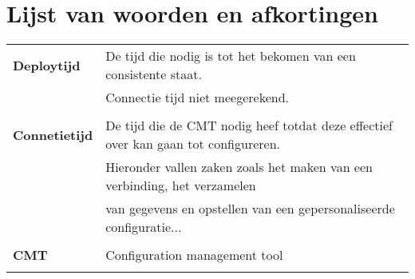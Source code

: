 


\chapter*{Lijst van woorden en afkortingen}

\begin{tabular}{l  l }
\textbf{Deploytijd} & De tijd die nodig is tot het bekomen van een consistente staat. \\ &Connectie tijd niet meegerekend. \\ \\
\textbf{Connetietijd} & De tijd die de CMT nodig heef totdat deze effectief over kan gaan tot configureren. \\ &  Hieronder vallen zaken zoals het maken van een verbinding, het verzamelen  \\ & van gegevens en opstellen van een gepersonaliseerde configuratie... \\ \\
\textbf{CMT} & Configuration management tool \\ \\
\end{tabular}